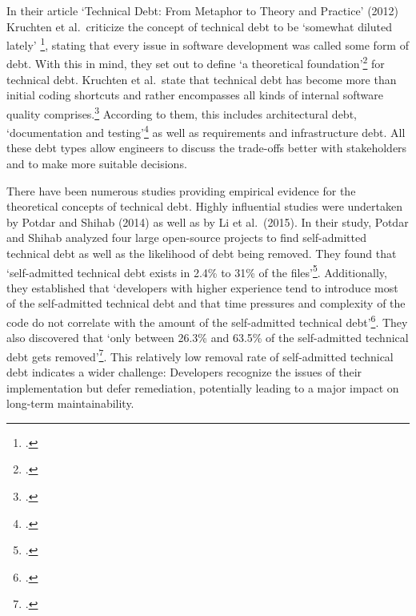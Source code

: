 In their article `Technical Debt: From Metaphor to Theory and Practice' (2012) Kruchten et al.\ criticize the concept of technical debt to be `somewhat diluted lately' \footcite[18]{kruchtenTechnicalDebtMetaphor2012}, stating that every issue in software development was called some form of debt. 
With this in mind, they set out to define `a theoretical foundation'\footcite[19]{kruchtenTechnicalDebtMetaphor2012} for technical debt.
Kruchten et al.\ state that technical debt has become more than initial coding shortcuts and rather encompasses all kinds of internal software quality comprises.\footcite[19]{kruchtenTechnicalDebtMetaphor2012}
According to them, this includes architectural debt, `documentation and testing'\footcite[20]{kruchtenTechnicalDebtMetaphor2012} as well as requirements and infrastructure debt.
All these debt types allow engineers to discuss the trade-offs better with stakeholders and to make more suitable decisions.

There have been numerous studies providing empirical evidence for the theoretical concepts of technical debt. Highly influential studies were undertaken by Potdar and Shihab (2014) as well as by Li et al.\ (2015).
In their study, Potdar and Shihab analyzed four large open-source projects to find self-admitted technical debt as well as the likelihood of debt being removed. They found that `self-admitted technical debt exists in 2.4\% to 31\% of the files'\footcite[1]{potdarExploratoryStudySelfAdmitted2014}.
Additionally, they established that `developers with higher experience tend to introduce most of the self-admitted technical debt and that time pressures and complexity of the code do not correlate with the amount of the self-admitted technical debt'\footcite[1]{potdarExploratoryStudySelfAdmitted2014}.
They also discovered that `only between 26.3\% and 63.5\% of the self-admitted technical debt gets removed'\footcite[1]{potdarExploratoryStudySelfAdmitted2014}. This relatively low removal rate of self-admitted technical debt indicates a wider challenge:
Developers recognize the issues of their implementation but defer remediation, potentially leading to a major impact on long-term maintainability.

